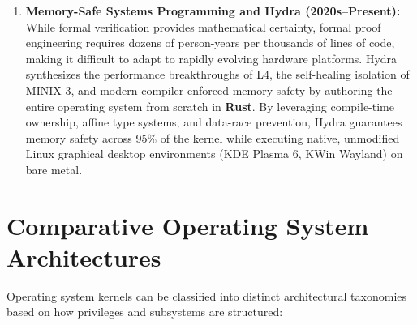 \begin{enumerate}
    \item \textbf{Memory-Safe Systems Programming and Hydra (2020s--Present):} While formal verification provides mathematical certainty, formal proof engineering requires dozens of person-years per thousands of lines of code, making it difficult to adapt to rapidly evolving hardware platforms. Hydra synthesizes the performance breakthroughs of L4, the self-healing isolation of MINIX 3, and modern compiler-enforced memory safety by authoring the entire operating system from scratch in \textbf{Rust}. By leveraging compile-time ownership, affine type systems, and data-race prevention, Hydra guarantees memory safety across 95\% of the kernel while executing native, unmodified Linux graphical desktop environments (KDE Plasma 6, KWin Wayland) on bare metal.
\end{enumerate}

\section{Comparative Operating System Architectures}
\label{sec:comparative_taxonomies}

Operating system kernels can be classified into distinct architectural taxonomies based on how privileges and subsystems are structured:

